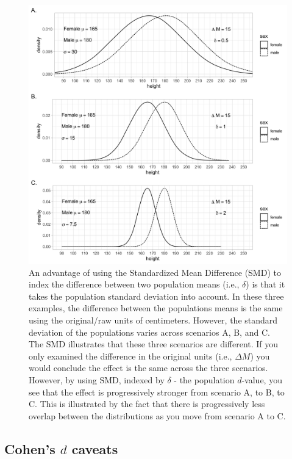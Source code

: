 \documentclass[
]{krantz}
\begin{document}
\begin{figure}
\includegraphics[width=1\linewidth]{ch_populations/images/dvalue_ex2} \caption{An advantage of using the Standardized Mean Difference (SMD) to index the difference between two population means (i.e., $\delta$) is that it takes the population standard deviation into account. In these three examples, the difference between the populations means is the same using the original/raw units of centimeters. However, the standard deviation of the populations varies across scenarios A, B, and C. The SMD illustrates that these three scenarios are different. If you only examined the difference in the original units (i.e., $\Delta M$) you would conclude the effect is the same across the three scenarios. However, by using SMD, indexed by $\delta$ - the population $d$-value, you see that the effect is progressively stronger from scenario A, to B, to C. This is illustrated by the fact that there is progressively less overlap between the distributions as you move from scenario A to C.}\label{fig:dex2}
\end{figure}

\hypertarget{cohens-d-caveats}{%
\subsection{\texorpdfstring{Cohen's \(d\) caveats}{Cohen's d caveats}}\label{cohens-d-caveats}}
\end{document}
